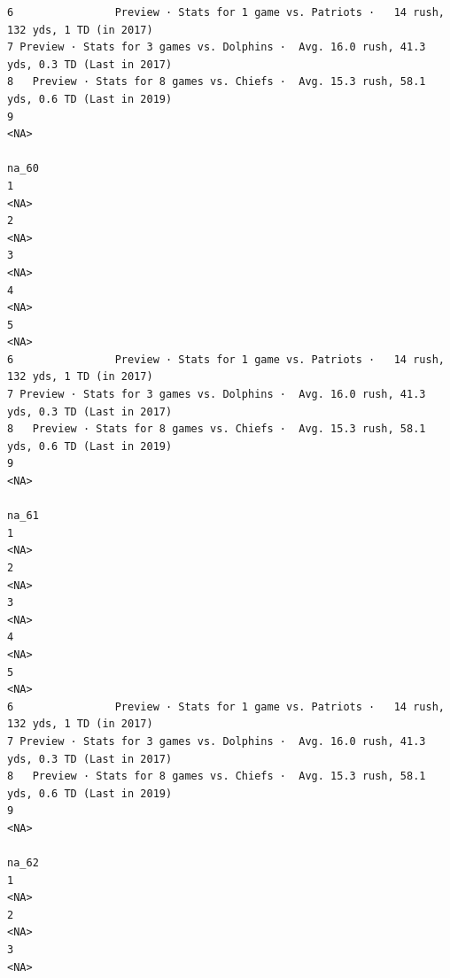 \documentclass[
]{article}
\begin{document}
\begin{verbatim}
6                Preview · Stats for 1 game vs. Patriots ·   14 rush, 132 yds, 1 TD (in 2017)
7 Preview · Stats for 3 games vs. Dolphins ·  Avg. 16.0 rush, 41.3 yds, 0.3 TD (Last in 2017)
8   Preview · Stats for 8 games vs. Chiefs ·  Avg. 15.3 rush, 58.1 yds, 0.6 TD (Last in 2019)
9                                                                                        <NA>
                                                                                        na_60
1                                                                                        <NA>
2                                                                                        <NA>
3                                                                                        <NA>
4                                                                                        <NA>
5                                                                                        <NA>
6                Preview · Stats for 1 game vs. Patriots ·   14 rush, 132 yds, 1 TD (in 2017)
7 Preview · Stats for 3 games vs. Dolphins ·  Avg. 16.0 rush, 41.3 yds, 0.3 TD (Last in 2017)
8   Preview · Stats for 8 games vs. Chiefs ·  Avg. 15.3 rush, 58.1 yds, 0.6 TD (Last in 2019)
9                                                                                        <NA>
                                                                                        na_61
1                                                                                        <NA>
2                                                                                        <NA>
3                                                                                        <NA>
4                                                                                        <NA>
5                                                                                        <NA>
6                Preview · Stats for 1 game vs. Patriots ·   14 rush, 132 yds, 1 TD (in 2017)
7 Preview · Stats for 3 games vs. Dolphins ·  Avg. 16.0 rush, 41.3 yds, 0.3 TD (Last in 2017)
8   Preview · Stats for 8 games vs. Chiefs ·  Avg. 15.3 rush, 58.1 yds, 0.6 TD (Last in 2019)
9                                                                                        <NA>
                                                                                        na_62
1                                                                                        <NA>
2                                                                                        <NA>
3                                                                                        <NA>

\end{verbatim}
\end{document}
